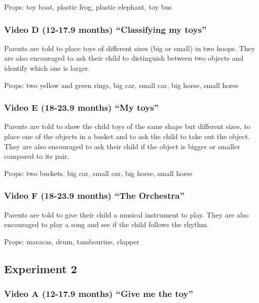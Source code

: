\documentclass[man,floatsintext]{apa6}
\begin{document}
\begin{appendix}
Props: toy boat, plastic frog, plastic elephant, toy bus

\hypertarget{video-d-12-17.9-months-classifying-my-toys}{%
\subsubsection{Video D (12-17.9 months) ``Classifying my
toys''}\label{video-d-12-17.9-months-classifying-my-toys}}

Parents are told to place toys of different sizes (big or small) in two
hoops. They are also encouraged to ask their child to distinguish
between two objects and identify which one is larger.

Props: two yellow and green rings, big car, small car, big horse, small
horse

\hypertarget{video-e-18-23.9-months-my-toys}{%
\subsubsection{Video E (18-23.9 months) ``My
toys''}\label{video-e-18-23.9-months-my-toys}}

Parents are told to show the child toys of the same shape but different
sizes, to place one of the objects in a basket and to ask the child to
take out the object. They are also encouraged to ask their child if the
object is bigger or smaller compared to its pair.

Props: two buckets, big car, small car, big horse, small horse

\hypertarget{video-f-18-23.9-months-the-orchestra}{%
\subsubsection{Video F (18-23.9 months) ``The
Orchestra''}\label{video-f-18-23.9-months-the-orchestra}}

Parents are told to give their child a musical instrument to play. They
are also encouraged to play a song and see if the child follows the
rhythm.

Props: maracas, drum, tambourine, clapper

\hypertarget{experiment-2}{%
\subsection{Experiment 2}\label{experiment-2}}

\hypertarget{video-a-12-17.9-months-give-me-the-toy}{%
\subsubsection{Video A (12-17.9 months) ``Give me the
toy''}\label{video-a-12-17.9-months-give-me-the-toy}}


\end{appendix}
\end{document}
